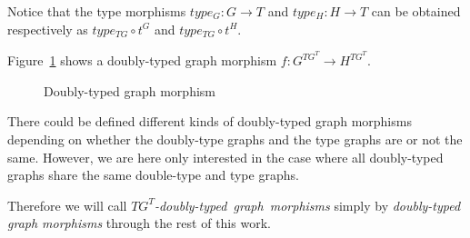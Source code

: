 Notice that the type morphisms $type_G : G \rightarrow T$ and $type_H : H \rightarrow T$ can be obtained respectively as $type_{TG} \circ t^G$ and $type_{TG} \circ t^H$.

\begin{example} Figure~\ref{fig:process:doubly-typed-graph-morphism} shows a doubly-typed graph morphism $f : G^{TG^T} \rightarrow H^{TG^T}$.

\begin{figure}[!ht]
  \centering
  \caption{Doubly-typed graph morphism}\label{fig:process:doubly-typed-graph-morphism}
\end{figure}
\end{example}

\begin{remark} There could be defined different kinds of doubly-typed graph morphisms depending on whether the doubly-type graphs and the type graphs are or not the same. However, we are here only interested in the case where all doubly-typed graphs share the same double-type and type graphs.

Therefore we will call \mbox{\emph{$TG^T$-doubly-typed graph morphisms}} simply by \emph{doubly-typed graph morphisms} through the rest of this work.

\end{remark}


